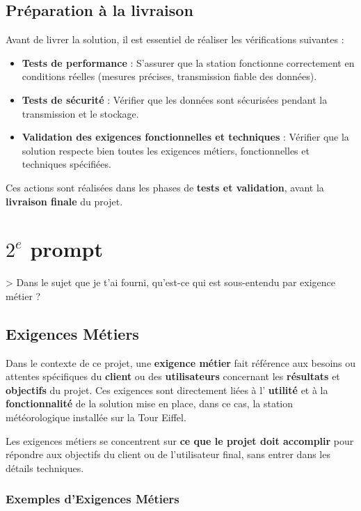 \documentclass[titlepage]{article}
\begin{document}
	\subsection{Préparation à la livraison}
	Avant de livrer la solution, il est essentiel de réaliser les vérifications suivantes :
	\begin{itemize}
		\item \textbf{Tests de performance} : S'assurer que la station fonctionne correctement en conditions réelles (mesures précises, transmission fiable des données).
		\item \textbf{Tests de sécurité} : Vérifier que les données sont sécurisées pendant la transmission et le stockage.
		\item \textbf{Validation des exigences fonctionnelles et techniques} : Vérifier que la solution respecte bien toutes les exigences métiers, fonctionnelles et techniques spécifiées.
	\end{itemize}
	Ces actions sont réalisées dans les phases de \textbf{tests et validation}, avant la \textbf{livraison finale} du projet.

	\section{$2^e$ prompt}

	> Dans le sujet que je t'ai fourni, qu'est-ce qui est sous-entendu par exigence métier ?

	\subsection{Exigences Métiers}
	Dans le contexte de ce projet, une \textbf{exigence métier} fait référence aux besoins ou attentes spécifiques du \textbf{client} ou des \textbf{utilisateurs} concernant les \textbf{résultats} et \textbf{objectifs} du projet. Ces exigences sont directement liées à l' \textbf{utilité} et à la \textbf{fonctionnalité} de la solution mise en place, dans ce cas, la station météorologique installée sur la Tour Eiffel.

	Les exigences métiers se concentrent sur \textbf{ce que le projet doit accomplir} pour répondre aux objectifs du client ou de l'utilisateur final, sans entrer dans les détails techniques.

	\subsubsection{Exemples d'Exigences Métiers}
\end{document}
